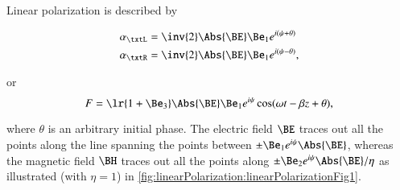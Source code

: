 

Linear polarization is described by

\begin{dmath}\label{eqn:polarization:280}
\begin{aligned}
\alpha_\txtL &= \inv{2}\Abs{\BE} \Be_1 e^{i(\psi + \theta)} \\
\alpha_\txtR &= \inv{2}\Abs{\BE} \Be_1 e^{i(\psi - \theta)},
\end{aligned}
\end{dmath}

or
\begin{dmath}\label{eqn:polarization:300}
F = \lr{ 1 + \Be_3 } \Abs{\BE} \Be_1 e^{i\psi} \cos( \omega t - \beta z + \theta ),
\end{dmath}

where \( \theta \) is an arbitrary initial phase.  The electric field \( \BE \) traces out all the points along the line spanning the points between \( \pm \Be_1 e^{i\psi} \Abs{\BE} \), whereas the magnetic field \( \BH \) traces
out all the points along \( \pm \Be_2 e^{i\psi} \Abs{\BE}/\eta \) as illustrated (with \( \eta = 1 \)) in
\cref{fig:linearPolarization:linearPolarizationFig1}.

